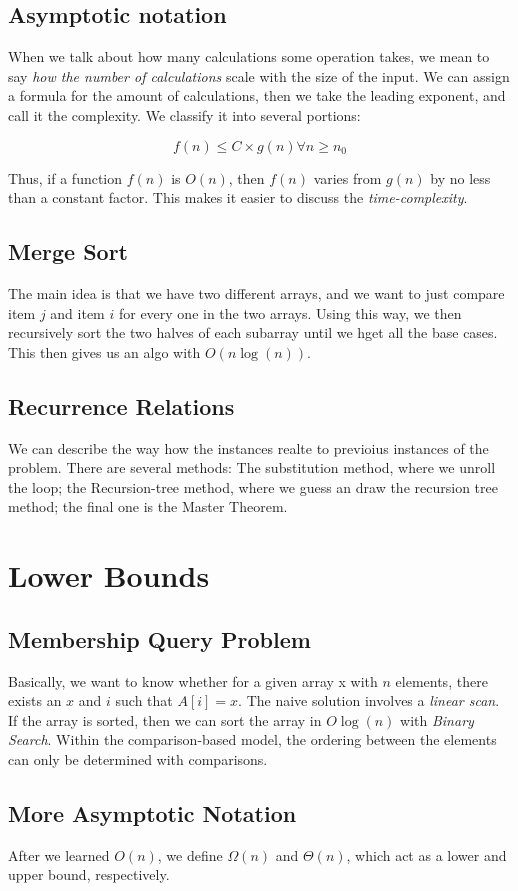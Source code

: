 \documentclass[portrait,10pt, a4paper]{article}
\begin{document}
\begin{multicols*}{3}
\subsection{Asymptotic notation}
		When we talk about how many calculations some operation takes, we mean to say \textit{how the number of calculations		} scale with the size of the input. We can assign a formula for the amount of calculations, then we take the leading
		exponent, and call  it the complexity. We classify it into several portions:

		\[ f(n) \leq C \times g(n) \forall n \geq n_{0}\]
		
		Thus, if a function $f(n)$ is $O(n)$, then $f(n)$ varies from $g(n)$ by no less than a constant factor. This makes
		it easier to discuss the \textit{time-complexity}.
\subsection{Merge Sort}
		The main idea is that we have two different arrays, and we want to just compare item $j$ and item $i$ for every
		one in the two arrays. Using this way, we then recursively sort the two halves of each subarray until we hget all
		the base cases. This then gives us an algo with $O(n\log(n))$.

\subsection{Recurrence Relations}
		We can describe the way how the instances realte to previoius instances of the problem. There are several methods:
		The substitution method, where we unroll the loop; the Recursion-tree method, where we guess an draw the 
		recursion tree method; the final one is the Master Theorem.
\section{Lower Bounds}
		\subsection{Membership Query Problem}	
			Basically, we want to know whether for a given array x with $n$ elements, there exists an $x$ and $i$ such 	
			that $A[i] = x$. The naive solution involves a \textit{linear scan}. If the array is sorted, then we can 
			sort the array in $O\log(n)$ with \textit{Binary Search}. Within the comparison-based model, the ordering
			between the elements can only be determined with comparisons.
		\subsection{More Asymptotic Notation}
			After we learned $O(n)$, we define $\Omega(n)$ and $\Theta(n)$, which act as a lower and upper bound,
			respectively.


\end{multicols*}
\end{document}
